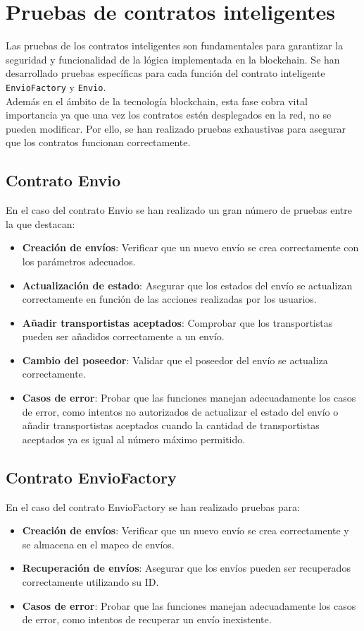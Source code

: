 \section{Pruebas de contratos inteligentes}
Las pruebas de los contratos inteligentes son fundamentales para garantizar la seguridad y funcionalidad de la lógica
implementada en la blockchain. Se han desarrollado pruebas específicas para cada función del contrato inteligente
\texttt{EnvioFactory} y \texttt{Envio}.\\

Además en el ámbito de la tecnología blockchain, esta fase cobra vital importancia ya que una vez los contratos estén desplegados
en la red, no se pueden modificar. Por ello, se han realizado pruebas exhaustivas para asegurar que los contratos
funcionan correctamente.\\

\subsection{Contrato Envio}
En el caso del contrato Envio se han realizado un gran número de pruebas entre la que destacan:
\begin{itemize}
    \item \textbf{Creación de envíos}: Verificar que un nuevo envío se crea correctamente con los parámetros adecuados.
    \item \textbf{Actualización de estado}: Asegurar que los estados del envío se actualizan correctamente en función de las acciones realizadas por los usuarios.
    \item \textbf{Añadir transportistas aceptados}: Comprobar que los transportistas pueden ser añadidos correctamente a un envío.
    \item \textbf{Cambio del poseedor}: Validar que el poseedor del envío se actualiza correctamente.
    \item \textbf{Casos de error}: Probar que las funciones manejan adecuadamente los casos de error, como intentos no autorizados de actualizar el estado del envío o
    añadir transportistas aceptados cuando la cantidad de transportistas aceptados ya es igual al número máximo permitido.
\end{itemize}



\subsection{Contrato EnvioFactory}
En el caso del contrato EnvioFactory se han realizado pruebas para:
\begin{itemize}
    \item \textbf{Creación de envíos}: Verificar que un nuevo envío se crea correctamente y se almacena en el mapeo de envíos.
    \item \textbf{Recuperación de envíos}: Asegurar que los envíos pueden ser recuperados correctamente utilizando su ID.
    \item \textbf{Casos de error}: Probar que las funciones manejan adecuadamente los casos de error, como intentos de recuperar un envío inexistente.
\end{itemize}

